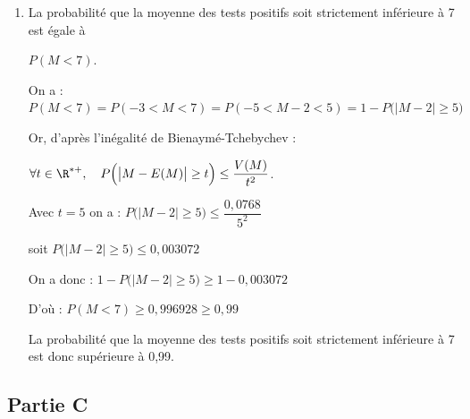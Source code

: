 \begin{enumerate}
\begin{enumerate}
		
		
	On a bien :  $\mathrm{E}(M)=2$ et  $\mathrm{V}(M)=\np{0,0768}$.
		
		\item La probabilité que la moyenne des tests positifs soit strictement inférieure à 7 est égale à 
		
		$P(M<7)$.
		
		On a  : $P(M<7) = P(-3<M<7)= P(-5< M-2<5) = 1- P\Big(\big|M-2\big| \geq 5\Big)$
		
		Or, d'après l'inégalité de Bienaymé-Tchebychev :
		
		$\forall t \in \R^{*+}, \quad P\Big(\big|M - E(M)\big| \geq t\Big) \leq  \dfrac{V(M)}{t^2 } $.
		
		Avec $t= 5$  on  a : $P\Big(\big|M- 2\big| \geq 5\Big) \leq  \dfrac{0,0768}{  5^2 } $
		
		soit  $ P\Big(\big|M-2\big| \geq 5 \Big) \leq 0,003072$
		
		On a donc :  $1- P\Big(\big|M-2\big| \geq 5 \Big) \geq 1- 0,003072$
		
		D'où : $P(M<7) \geq  0,996928 \geq 0,99$
		
		
	La probabilité que la moyenne des tests positifs soit strictement inférieure à 7 est donc  supérieure à 0,99.
		
	\end{enumerate}
\end{enumerate}

\subsection*{Partie C}


